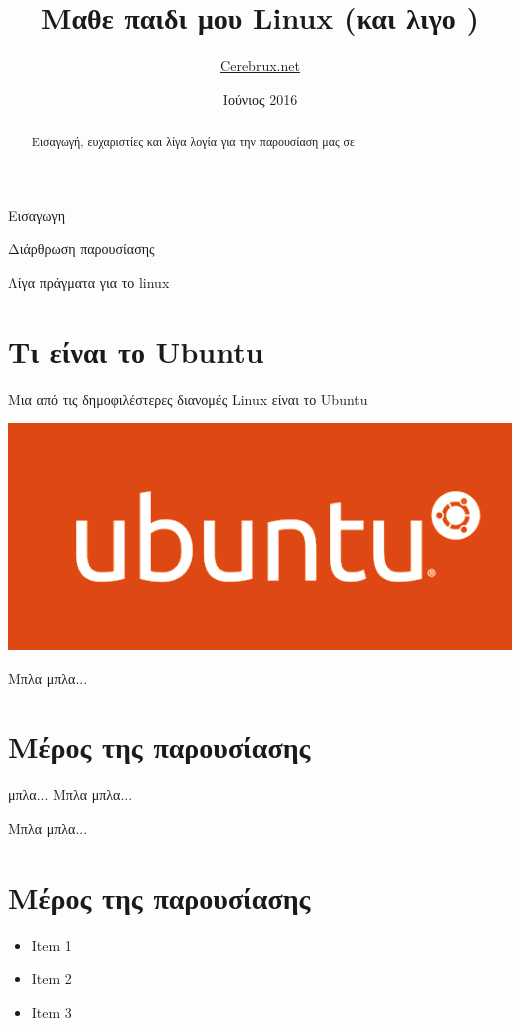 \documentclass{beamer}							%
\title{Μαθε παιδι μου Linux (και λιγο \texorpdfstring\XeLaTeX)) }
\author{\href{www.Cerebrux.net}{Cerebrux.net}}
\date{Ιούνιος 2016}
\begin{document}
\maketitle

\begin{frame}{Εισαγωγη}
\begin{abstract}
Εισαγωγή, ευχαριστίες και λίγα λογία για την παρουσίαση μας σε \XeLaTeX
\end{abstract}
\end{frame}

\begin{frame}{Διάρθρωση παρουσίασης}
\tableofcontents
\end{frame}

\begin{frame}{Λίγα πράγματα για το linux}
\section{Τι είναι το Ubuntu}
\begin{center}
\begin{definition}
Μια από τις δημοφιλέστερες διανομές Linux είναι το Ubuntu

\end{definition}

\includegraphics[width=0.7\linewidth]{ubuntu-logo}
\end{center}
\end{frame} 

\begin{frame}{Μπλα μπλα...}
\section{Μέρος της παρουσίασης}
\begin{alertblock}{μπλα...}
 Μπλα μπλα...
\end{alertblock}
\end{frame} 

\begin{frame}{Μπλα μπλα...}
\section{Μέρος της παρουσίασης}
\begin{itemize}
\item Item 1
\item Item 2
\item Item 3
\end{itemize}

\end{frame} 
\end{document}
